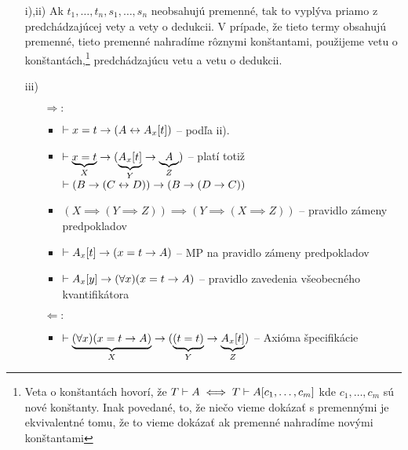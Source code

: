 \begin{dokaz}
    \noindent
    \begin{itemize}
        \item[i),ii)] Ak $t_1,\dots,t_n,s_1,\dots,s_n$ neobsahujú
            premenné, tak to vyplýva priamo z predchádzajúcej vety a vety
            o dedukcii. V prípade, že tieto termy obsahujú premenné,
            tieto premenné nahradíme rôznymi konštantami, použijeme
            vetu o konštantách,\footnote{Veta o konštantách hovorí, že
            $T \vdash A \iff T \vdash A[c_1,\dots,c_m]$ kde
            $c_1,\dots,c_m$ sú nové konštanty. Inak povedané,
            to, že niečo vieme dokázať s premennými je ekvivalentné
            tomu, že to vieme dokázať ak premenné nahradíme novými
            konštantami} predchádzajúcu vetu a vetu o dedukcii.
        \item[iii)]
            \begin{itemize}
            \item[$\Rightarrow:$]
                \begin{itemize}
                \item $\vdash x=t \rightarrow (A \leftrightarrow
                    A_x[t])$ -- podľa ii).
                \item $\vdash \underbrace{x=t}_X \rightarrow (
                    \underbrace{A_x[t]}_Y \rightarrow
                    \underbrace{A}_Z)$ -- platí totiž
                    $\vdash (B \rightarrow (C \leftrightarrow D))
                    \rightarrow (B \rightarrow (D \rightarrow C))$
                \item $(X \implies (Y \implies Z)) \implies
                       (Y \implies (X \implies Z))$ -- pravidlo zámeny
                       predpokladov
                \item $\vdash A_x[t] \rightarrow (x=t \rightarrow A)$ --
                    MP na pravidlo zámeny predpokladov
                \item $\vdash A_x[y] \rightarrow (\forall x)(x=t
                    \rightarrow A)$ -- pravidlo zavedenia všeobecného
                    kvantifikátora
                \end{itemize}

            \item[$\Leftarrow:$]
                \begin{itemize}
                \item $\vdash \underbrace{(\forall x)(x=t \rightarrow
                    A)}_X \rightarrow
                        (\underbrace{(t=t)}_Y \rightarrow
                        \underbrace{A_x[t]}_Z)$ -- Axióma špecifikácie


\end{itemize}
\end{itemize}
\end{itemize}
\end{dokaz}
